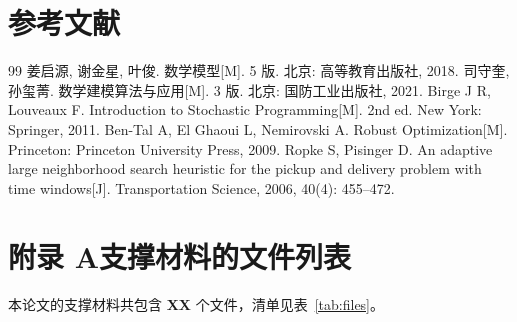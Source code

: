 \documentclass[12pt,a4paper]{ctexart}
\begin{document}
\section*{参考文献}

\begin{thebibliography}{99}
   姜启源, 谢金星, 叶俊. 数学模型[M]. 5 版. 北京: 高等教育出版社, 2018.
   司守奎, 孙玺菁. 数学建模算法与应用[M]. 3 版. 北京: 国防工业出版社, 2021.
   Birge J R, Louveaux F. Introduction to Stochastic Programming[M].
                 2nd ed. New York: Springer, 2011.
   Ben-Tal A, El Ghaoui L, Nemirovski A. Robust Optimization[M].
                 Princeton: Princeton University Press, 2009.
   Ropke S, Pisinger D. An adaptive large neighborhood search heuristic for the
                 pickup and delivery problem with time windows[J]. Transportation Science,
                 2006, 40(4): 455--472.
\end{thebibliography}

\newpage
\appendix

\section*{附录 A\quad 支撑材料的文件列表}
\label{app:files}

本论文的支撑材料共包含 \textbf{XX} 个文件，清单见表~\ref{tab:files}。
\end{document}
